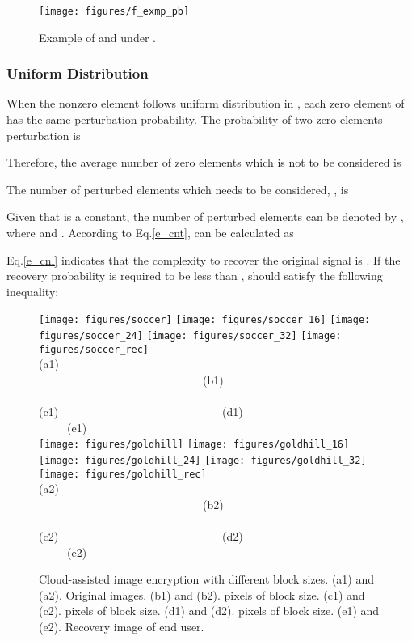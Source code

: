 \documentclass[conference]{IEEEtran}
\begin{document}
\begin{figure}
\begin{center}
  \texttt{[image: figures/f\_exmp\_pb]}\\
  \caption{{\footnotesize Example of  and  under .}}\label{f_examp_pb}
  \end{center}
\end{figure}
\subsubsection{Uniform Distribution}
When the nonzero element follows uniform distribution in , each zero element of  has the same perturbation probability. The probability of two zero elements perturbation is

Therefore, the average number of zero elements which is not to be considered is

The number of perturbed elements which needs to be considered, ,  is


Given that  is a constant, the number of perturbed elements  can be denoted by , where  and .
According to Eq.\ref{e_cnt},   can be calculated as


Eq.\ref{e_cnl} indicates  that the complexity to recover  the original signal is . If the recovery probability is required to be less than ,  should satisfy the following inequality:


\begin{figure*}[t]
\begin{center}
  \texttt{[image: figures/soccer]}
  \texttt{[image: figures/soccer\_16]}
  \texttt{[image: figures/soccer\_24]}
  \texttt{[image: figures/soccer\_32]}
  \texttt{[image: figures/soccer\_rec]}  \\
 {\footnotesize (a1) ~~~~~~~~~~~~~~~~~~~~~~~~~~~~~(b1)~~~~~~~~~~~~~~~~~~~~~~~~~~~~~ (c1)~~~~~~~~~~~~~~~~~~~~~~~~~~~~~(d1)~~~~~~~~~~~~~~~~~~~~~~~~~~~~~(e1) }\\
  \texttt{[image: figures/goldhill]}
  \texttt{[image: figures/goldhill\_16]}
  \texttt{[image: figures/goldhill\_24]}
  \texttt{[image: figures/goldhill\_32]}
  \texttt{[image: figures/goldhill\_rec]}  \\
   {\footnotesize (a2) ~~~~~~~~~~~~~~~~~~~~~~~~~~~~~(b2)~~~~~~~~~~~~~~~~~~~~~~~~~~~~~ (c2)~~~~~~~~~~~~~~~~~~~~~~~~~~~~~(d2)~~~~~~~~~~~~~~~~~~~~~~~~~~~~~(e2) }\\
 \end{center}
  \caption{{\footnotesize Cloud-assisted image encryption with different block sizes. (a1) and (a2). Original images. (b1) and (b2).  pixels of block size. (c1) and (c2).  pixels of block size. (d1) and (d2).    pixels of block size. (e1) and (e2). Recovery image of end user.}}\label{f_se_diff_block_size}
\end{figure*}
\end{document}
